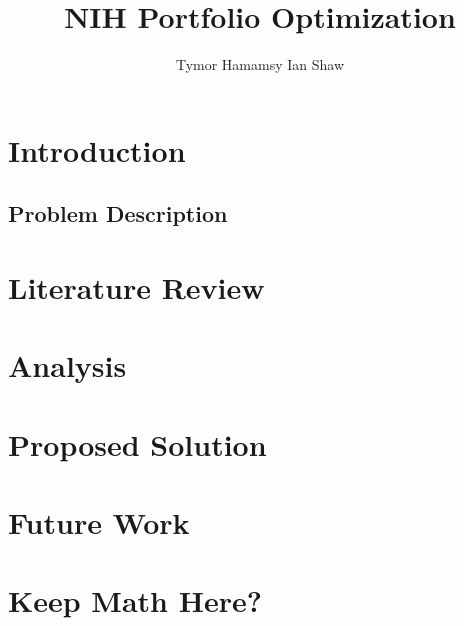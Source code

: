 \documentclass{article}
\title{NIH Portfolio Optimization}
\author{Tymor Hamamsy \quad Ian Shaw}
\begin{document}
\maketitle

\begin{abstract}

\end{abstract}


\newpage

\tableofcontents

\newpage

\section{Introduction}

\subsection{Problem Description}

\section{Literature Review}

\section{Analysis}

\section{Proposed Solution}

\section{Future Work}

\newpage

\appendix
\appendixpage
\addappheadtotoc

\section{Keep Math Here?}



\end{document}

